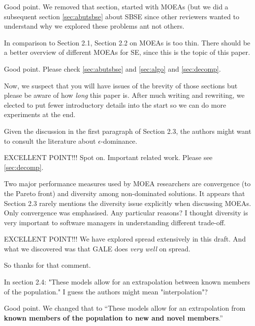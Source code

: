 \documentclass[10pt,journal,compsoc]{IEEEtran}
\newcommand{\tion}[1]{\textsection\ref{sec:#1}}
\newenvironment{changed}{\par\color{MyDarkBlue}}{\par}
\newcommand{\ADD}[1]{\textcolor{MyDarkBlue}{{\bf #1}}}
\begin{document}
\begin{changed}
Good point. We removed that section, started with MOEAs (but we
did a subsequent section \tion{abutsbse} about SBSE since other reviewers
wanted to understand why we explored these problems ant not others.
\end{changed}

In comparison to Section 2.1, Section 2.2 on MOEAs is too thin. There
should be a better overview of different MOEAs for SE, since this is the
topic of this paper.


\begin{changed}
Good point. Please check \tion{abutsbse}
and \tion{algo} and \tion{decomp}.

Now, we suspect that you will have issues of the brevity of those sections
but please be aware of how {\em long} this paper is. After much writing
and rewriting, we elected to put fewer introductory details into the start
so we can do more experiments at the end. 
\end{changed}

Given the discussion in the first paragraph of Section 2.3, the authors
might want to consult the literature about $\epsilon$-dominance.


\begin{changed}
EXCELLENT POINT!!!  Spot on. Important related work. Please see  \tion{decomp}.

\end{changed}

Two major performance measures used by MOEA researchers are convergence
(to the Pareto front) and diversity among non-dominated solutions. It
appears that Section 2.3 rarely mentions the diversity issue explicitly
when discussing MOEAs. Only convergence was emphasised. Any particular
reasons? I thought diversity is very important to software managers in
understanding different trade-off.


\begin{changed}
EXCELLENT POINT!!!  We have explored spread extensively in this draft.
And what we discovered was that GALE does {\em very well} on spread.

So thanks for that comment.
\end{changed}


In section 2.4: "These models allow for an extrapolation between known
members of the population." I guess the authors might mean
"interpolation"?
\begin{changed}
Good point. We changed that to  ``These models allow
for an extrapolation from \ADD{known members of the
population to new and novel members}.''
\end{changed}
\end{document}
